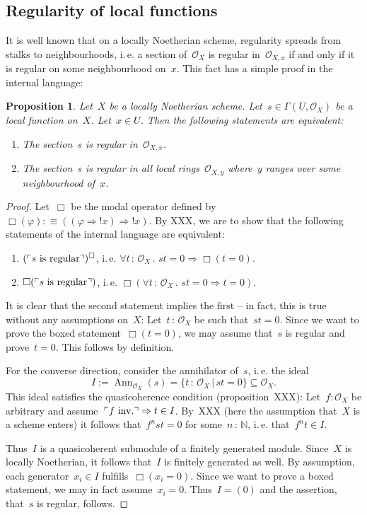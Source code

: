 \documentclass[10pt]{amsart}
\theoremstyle{definition}
\theoremstyle{plain}
\newtheorem{prop}[defn]{Proposition}
\theoremstyle{remark}
\renewcommand{\O}{\mathcal{O}}
\newcommand{\NN}{\mathbb{N}}
\DeclareMathOperator{\Ann}{Ann}
\newcommand{\?}{\,{:}\,}
\renewcommand{\_}{\mathpunct{.}\,}
\newcommand{\speak}[1]{\ulcorner\text{\textnormal{#1}}\urcorner}
\begin{document}
\subsection{Regularity of local functions}
It is well known that on a locally Noetherian scheme, regularity spreads from
stalks to neighbourhoods, i.\,e. a section of~$\O_X$ is regular
in~$\O_{X,x}$ if and only if it is regular on some neighbourhood on~$x$.
This fact has a simple proof in the internal language:
\begin{prop}Let~$X$ be a locally Noetherian scheme. Let~$s \in \Gamma(U,\O_X)$
be a local function on~$X$. Let~$x \in U$. Then the following statements are
equivalent:
\begin{enumerate}
\item The section~$s$ is regular in~$\O_{X,x}$.
\item The section~$s$ is regular in all local rings~$\O_{X,y}$ where~$y$ ranges
over some neighbourhood of~$x$.
\end{enumerate}
\end{prop}
\begin{proof}
Let~$\Box$ be the modal operator defined by~$\Box(\varphi) :\equiv ((\varphi
\Rightarrow {!x}) \Rightarrow {!x})$. By XXX, we are to show that the following
statements of the internal language
are equivalent:
\begin{enumerate}
\item $(\speak{$s$ is regular})^\Box$, i.\,e.
$\forall t\?\O_X\_ st = 0 \Rightarrow \Box(t = 0)$.
\item $\Box(\speak{$s$ is regular})$, i.\,e.
$\Box(\forall t\?\O_X\_ st = 0 \Rightarrow t = 0)$.
\end{enumerate}
It is clear that the second statement implies the first -- in fact, this is true
without any assumptions on~$X$: Let~$t\?\O_X$ be such that~$st = 0$. Since we want to
prove the boxed statement~$\Box(t=0)$, we may assume that~$s$ is regular and
prove~$t = 0$. This follows by definition.

For the converse direction, consider the annihilator of~$s$, i.\,e. the ideal
\[ I := \Ann_{\O_X}(s) = \{ t\?\O_X \,|\, st = 0 \} \subseteq \O_X. \]
This ideal satisfies the quasicoherence condition (proposition~XXX):
Let~$f:\O_X$ be arbitrary and assume~$\speak{$f$ inv.} \Rightarrow t \in I$.
By~XXX (here the assumption that~$X$ is a scheme enters) it follows that~$f^n
st = 0$ for some~$n\?\NN$, i.\,e. that~$f^n t \in I$.

Thus~$I$ is a quasicoherent submodule of a finitely generated module. Since~$X$ is
locally Noetherian, it follows that~$I$ is finitely generated as well. By
assumption, each generator~$x_i \in I$ fulfills~$\Box(x_i = 0)$. Since we want
to prove a boxed statement, we may in fact assume~$x_i = 0$. Thus~$I = (0)$ and
the assertion, that~$s$ is regular, follows.
\end{proof}
\end{document}
